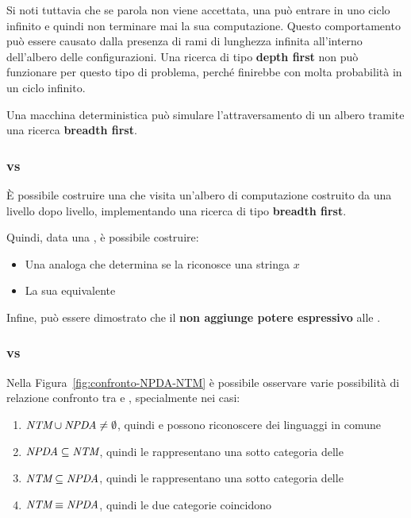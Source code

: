 \documentclass[italian, 10pt]{article}
\begin{document}
Si noti tuttavia che se parola non viene accettata, una \TM può entrare in uno ciclo infinito e quindi non terminare mai la sua computazione.
Questo comportamento può essere causato dalla presenza di rami di lunghezza infinita all'interno dell'albero delle configurazioni.
Una ricerca di tipo \textbf{depth first} non può funzionare per questo tipo di problema, perché finirebbe con molta probabilità in un ciclo infinito.

Una macchina deterministica può simulare l'attraversamento di un albero tramite una ricerca \textbf{breadth first}.

\subsubsection{\DTM vs \NTM}

È possibile costruire una \DTM che visita un'albero di computazione costruito da una \NTM livello dopo livello, implementando una ricerca di tipo \textbf{breadth first}.

Quindi, data una \NTM, è possibile costruire:

\begin{itemize}
  \item Una \DTM analoga che determina se la \NTM riconosce una stringa \(x\)
  \item La sua equivalente \DTM
\end{itemize}

Infine, può essere dimostrato che il \ND \textbf{non aggiunge potere espressivo} alle \TM.

\subsubsection{\NPDA vs \NTM}

Nella Figura~\ref{fig:confronto-NPDA-NTM} è possibile osservare varie possibilità di relazione confronto tra \NPDA e \NTM, specialmente nei casi:

\begin{enumerate}[label=\alph*), ref=(\alph*)]
  \item \label{enum:NTM-or-NPDA} \(\textit{NTM} \cup\textit{NPDA} \neq \emptyset\), quindi \NTM e \NPDA possono riconoscere dei linguaggi in comune
  \item \label{enum:NPDA-in-NTM} \(\textit{NPDA} \subseteq \textit{NTM}\), quindi le \NTM rappresentano una sotto categoria delle \NPDA
  \item \label{enum:NTM-in-NPDA} \(\textit{NTM} \subseteq \textit{NPDA}\), quindi le \NPDA rappresentano una sotto categoria delle \NTM
  \item \label{enum:NTM-equiv-NPDA} \(\textit{NTM} \equiv \textit{NPDA}\), quindi le due categorie coincidono
\end{enumerate}
\end{document}
